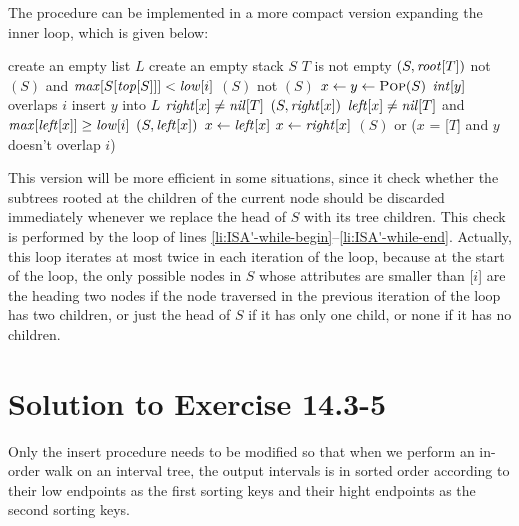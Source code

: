 \documentclass[a4paper, fleqn]{article}
\begin{document}
The  procedure can be implemented in a more
compact version expanding the inner  loop, which is given
below:

\begin{codebox}
\li create an empty list $L$
\li create an empty stack $S$
\li \If $T$ is not empty
\li   \Then {}$(S, \id{root}[T])$ \End
\li \Repeat
\li     \While not $(S)$
           and $\id{max}[S[\id{top}[S]]] < \id{low}[i]$
                                         \label{li:ISA'-while-begin}
\li       \Do {}$(S)$ \End       \label{li:ISA'-while-end}
\li     \If not $(S)$
\li       \Then
            $x \gets y \gets \textnormal{\scshape Pop}(S)$
\li         \If $\id{int}[y]$ overlaps $i$
\li           \Then insert $y$ into $L$ \End
\li         \If $\id{right}[x] \neq \id{nil}[T]$
\li           \Then {}$(S, \id{right}[x])$ \End
\li         \If     $\id{left}[x] \neq \id{nil}[T]$
                and $\id{max}[\id{left}[x]] \geq \id{low}[i]$
\li           \Then
                $(S, \id{left}[x])$
\li             $x \gets \id{left}[x]$
\li           \Else
                $x \gets \id{right}[x]$
              \End
          \End
\li \Until {}$(S)$ or
           ($x$ = [$T$] and $y$ doesn't overlap $i$)
\end{codebox}

This version will be more efficient in some situations, since it check
whether the subtrees rooted at the children of the current node should
be discarded immediately whenever we replace the head of $S$ with its
tree children. This check is performed by the  loop of lines
\ref{li:ISA'-while-begin}--\ref{li:ISA'-while-end}. Actually, this
 loop iterates at most twice in each iteration of the
 loop, because at the start of the  loop, the
only possible nodes in $S$ whose  attributes are smaller than
[$i$] are the heading two nodes if the node traversed in the
previous iteration of the  loop has two children, or just
the head of $S$ if it has only one child, or none if it has no
children.






\section*{Solution to Exercise 14.3-5}

Only the insert procedure needs to be modified so that when we perform
an in-order walk on an interval tree, the output intervals is in sorted
order according to their low endpoints as the first sorting keys and
their hight endpoints as the second sorting keys.
\end{document}
